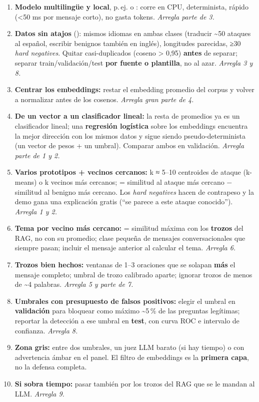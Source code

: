 \begin{enumerate}[leftmargin=14pt,itemsep=2pt]
  \item \textbf{Modelo multilingüe y local}, p.\,ej.  o : corre en CPU, determinista, rápido (<50 ms por mensaje corto), no gasta tokens. \emph{Arregla parte de 3.}
  \item \textbf{Datos sin atajos} (): mismos idiomas en ambas clases (traducir \textasciitilde50 ataques al español, escribir benignos también en inglés), longitudes parecidas, ≥30 \emph{hard negatives}. Quitar casi-duplicados (coseno > 0,95) \textbf{antes} de separar; separar train/validación/test \textbf{por fuente o plantilla}, no al azar. \emph{Arregla 3 y 8.}
  \item \textbf{Centrar los embeddings:} restar el embedding promedio del corpus y volver a normalizar antes de los cosenos. \emph{Arregla gran parte de 4.}
  \item \textbf{De un vector a un clasificador lineal:} la resta de promedios ya es un clasificador lineal; una \textbf{regresión logística} sobre los embeddings encuentra la mejor dirección con los mismos datos y sigue siendo pseudo-determinista (un vector de pesos + un umbral). Comparar ambos en validación. \emph{Arregla parte de 1 y 2.}
  \item \textbf{Varios prototipos + vecinos cercanos:} k ≈ 5–10 centroides de ataque (k-means) o k vecinos más cercanos;  = similitud al ataque más cercano − similitud al benigno más cercano. Los \emph{hard negatives} hacen de contrapeso y la demo gana una explicación gratis (“se parece a este ataque conocido”). \emph{Arregla 1 y 2.}
  \item \textbf{Tema por vecino más cercano:}  = similitud máxima con los \textbf{trozos} del RAG, no con su promedio; clase pequeña de mensajes conversacionales que siempre pasan; incluir el mensaje anterior al calcular el tema. \emph{Arregla 6.}
  \item \textbf{Trozos bien hechos:} ventanas de 1–3 oraciones que se solapan \textbf{más} el mensaje completo; umbral de trozo calibrado aparte; ignorar trozos de menos de \textasciitilde4 palabras. \emph{Arregla 5 y parte de 7.}
  \item \textbf{Umbrales con presupuesto de falsos positivos:} elegir el umbral en \textbf{validación} para bloquear como máximo \textasciitilde5\,\% de las preguntas legítimas; reportar la detección a ese umbral en \textbf{test}, con curva ROC e intervalo de confianza. \emph{Arregla 8.}
  \item \textbf{Zona gris:} entre dos umbrales, un juez LLM barato (si hay tiempo) o  con advertencia ámbar en el panel. El filtro de embeddings es la \textbf{primera capa}, no la defensa completa.
  \item \textbf{Si sobra tiempo:} pasar también por  los trozos del RAG que se le mandan al LLM. \emph{Arregla 9.}
\end{enumerate}

